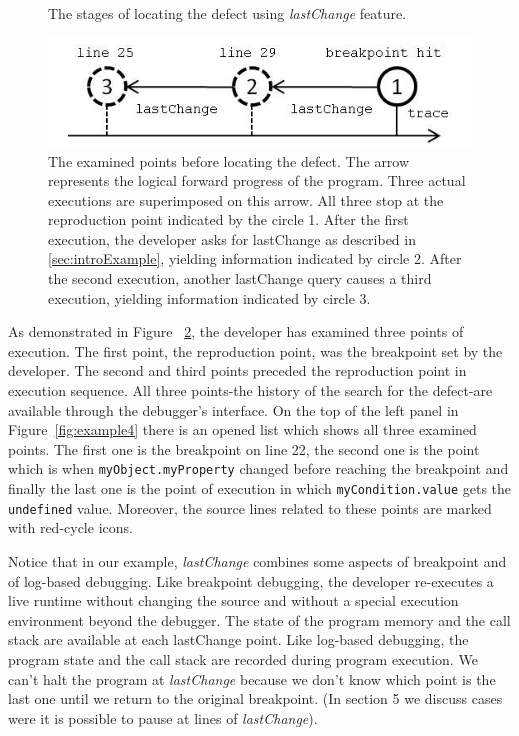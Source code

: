 \documentclass[runningheads,a4paper]{llncs}
\begin{document}
\begin{figure}[htp]
\caption{The stages of locating the defect using \textit{lastChange} feature.}
\label{fig:lastChange}
\end{figure}


\begin{figure}[htp]
\includegraphics{5-example-points.jpg}
\caption{The examined points before locating the defect. The arrow represents the logical forward progress of the program. Three actual executions are superimposed on this arrow. All three stop at the reproduction point indicated by the circle 1. After the first execution, the developer asks for lastChange as described in \ref{sec:introExample}, yielding information  indicated by circle 2. After the second execution, another lastChange query causes a third execution, yielding information indicated by circle 3.}
\label{fig:example-points}
\end{figure}



As demonstrated in Figure ~\ref{fig:example-points}, the developer has
examined three points of execution. The first point, the reproduction point,  was the breakpoint set by the developer.
The second and third points preceded the reproduction point in execution sequence.
All three points-the history
of the search for the defect-are available through the debugger's
interface. On the top of the left panel in Figure~\ref{fig:example4}
there is an opened list which shows all three examined points. The
first one is the breakpoint on line 22, the second one is the point
which is when \texttt{myObject.myProperty} changed before
reaching the breakpoint and finally the last one is the point of
execution in which \texttt{myCondition.value} gets the
\texttt{undefined} value. Moreover, the source lines related to these
points are marked with red-cycle icons.


Notice that in our example, \textit{lastChange} combines some aspects
of breakpoint and of log-based debugging. Like breakpoint debugging,
the developer re-executes a live runtime without changing the source
and without a special execution environment beyond the debugger. The
state of the program memory and the call stack are available at each
lastChange point. Like log-based debugging, the program state and the
call stack are recorded during program execution. We can't halt the
program at \textit{lastChange} because we don't know which point is the last
one until we return to the original breakpoint. (In section 5 we
discuss cases were it is possible to pause at lines of \textit{lastChange}).
\end{document}
